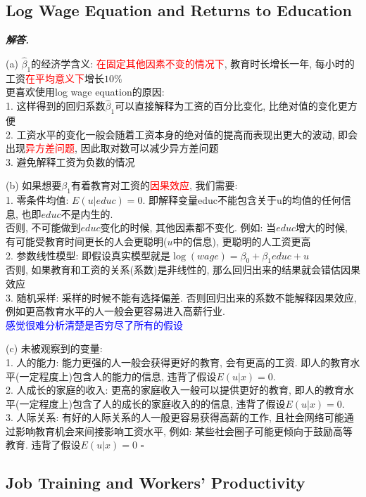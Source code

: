 \documentclass[10pt, a4paper, oneside]{ctexart}
\newenvironment{solution}{%
  \par\noindent\textbf{\textit{解答. }}\ignorespaces
}{%
  \hfill\ensuremath{\square}\par %
}
\begin{document}
\subsection{Log Wage Equation and Returns to Education}
\begin{solution}
(a) $\hat{\beta}_1$的经济学含义: \textcolor{red}{在固定其他因素不变的情况下}, 教育时长增长一年, 每小时的工资\textcolor{red}{在平均意义下}增长$10\%$\\
更喜欢使用log wage equation的原因:\\
1. 这样得到的回归系数$\hat{\beta}_1$可以直接解释为工资的百分比变化, 比绝对值的变化更方便\\
2. 工资水平的变化一般会随着工资本身的绝对值的提高而表现出更大的波动, 即会出现\textcolor{red}{异方差问题}, 因此取对数可以减少异方差问题\\
3. 避免解释工资为负数的情况

(b) 如果想要$\beta_1$有着教育对工资的\textcolor{red}{因果效应}, 我们需要:\\
1. 零条件均值: $E(u|educ)=0$. 即解释变量educ不能包含关于u的均值的任何信息, 也即$educ$不是内生的.\\
否则, 不可能做到$educ$变化的时候, 其他因素都不变化. 例如: 当$educ$增大的时候, 有可能受教育时间更长的人会更聪明($u$中的信息), 更聪明的人工资更高\\
2. 参数线性模型: 即假设真实模型就是$\log(wage) = \beta_0 + \beta_1 educ+u$\\
否则, 如果教育和工资的关系(系数)是非线性的, 那么回归出来的结果就会错估因果效应\\
3. 随机采样: 采样的时候不能有选择偏差. 否则回归出来的系数不能解释因果效应, 例如更高教育水平的人一般会更容易进入高薪行业.\\
\textcolor{blue}{感觉很难分析清楚是否穷尽了所有的假设}

(c) 未被观察到的变量:\\
1. 人的能力: 能力更强的人一般会获得更好的教育, 会有更高的工资. 即人的教育水平(一定程度上)包含人的能力的信息, 违背了假设$E(u|x)=0$.\\
2. 人成长的家庭的收入: 更高的家庭收入一般可以提供更好的教育, 即人的教育水平(一定程度上)包含了人的成长的家庭收入的的信息, 违背了假设$E(u|x)=0$.\\
3. 人际关系: 有好的人际关系的人一般更容易获得高薪的工作, 且社会网络可能通过影响教育机会来间接影响工资水平, 例如: 某些社会圈子可能更倾向于鼓励高等教育. 违背了假设$E(u|x)=0$
\end{solution}

\subsection{Job Training and Workers' Productivity}
\end{document}
